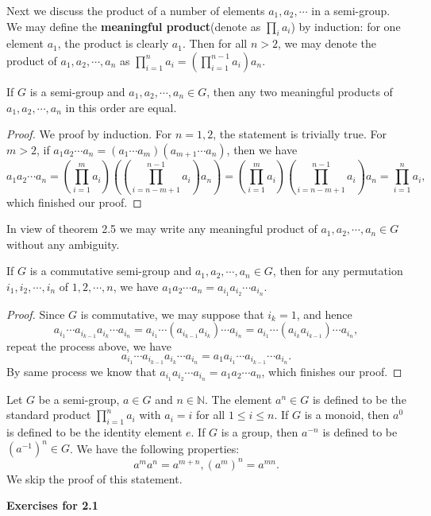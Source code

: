 Next we discuss the product of a number of elements $a_1,a_2,\cdots$ in a semi-group. We may define the \textbf{meaningful product}(denote as $\prod_{i}a_i$) by induction: for one element $a_1$, the product is clearly $a_1$. Then for all $n>2$, we may denote the product of $a_1,a_2,\cdots,a_n$ as $\prod_{i=1}^na_i=\left(\prod_{i=1}^{n-1}a_i\right)a_n$.
\begin{theorem}
If $G$ is a semi-group and $a_1,a_2,\cdots,a_n\in G$, then any two meaningful products of $a_1,a_2,\cdots,a_n$ in this order are equal.
\end{theorem}
\begin{proof}
We proof by induction. For $n=1,2$, the statement is trivially true. For $m>2$, if $a_1a_2\cdots a_n=\left( a_1\cdots a_m \right) \left( a_{m+1}\cdots a_n \right) $, then we have 
$$
a_1a_2\cdots a_n=\left( \prod_{i=1}^m{a_i} \right) \left( \left( \prod_{i=n-m+1}^{n-1}{a_i} \right) a_n \right) =\left( \prod_{i=1}^m{a_i} \right) \left( \prod_{i=n-m+1}^{n-1}{a_i} \right) a_n=\prod_{i=1}^n{a_i},
$$
which finished our proof.
\end{proof}
In view of theorem 2.5 we may write any meaningful product of $a_1,a_2,\cdots,a_n\in G$ without any ambiguity.
\begin{corollary}
If $G$ is a commutative semi-group and $a_1,a_2,\cdots,a_n\in G$, then for any permutation $i_1,i_2,\cdots,i_n$ of $1,2,\cdots,n$, we have $a_1a_2\cdots a_n=a_{i_1}a_{i_2}\cdots a_{i_n}$.
\end{corollary}
\begin{proof}
Since $G$ is commutative, we may suppose that $i_k=1$, and hence
$$
a_{i_1}\cdots a_{i_{k-1}}a_{i_k}\cdots a_{i_n}=a_{i_1}\cdots \left( a_{i_{k-1}}a_{i_k} \right) \cdots a_{i_n}=a_{i_1}\cdots \left( a_{i_k}a_{i_{k-1}} \right) \cdots a_{i_n},
$$
repeat the process above, we have
$$
a_{i_1}\cdots a_{i_{k-1}}a_{i_k}\cdots a_{i_n}=a_1a_{i_1}\cdots a_{i_{k-1}}\cdots a_{i_n}.
$$
By same process we know that $a_{i_1}a_{i_2}\cdots a_{i_n}=a_1a_2\cdots a_n$, which finishes our proof.
\end{proof}
Let $G$ be a semi-group, $a\in G$ and $n\in\mathbb{N}$. The element $a^n\in G$ is defined to be the standard product $\prod_{i=1}^na_i$ with $a_i=i$ for all $1\le i\le n$. If $G$ is a monoid, then $a^0$ is defined to be the identity element $e$. If $G$ is a group, then $a^{-n}$ is defined to be $(a^{-1})^n\in G$. We have the following properties:
$$a^ma^n=a^{m+n},(a^m)^n=a^{mn}.$$
We skip the proof of this statement.
\begin{center}
\begin{large}
    \textbf{Exercises for 2.1}
\end{large}
\end{center}
